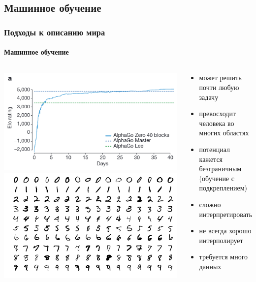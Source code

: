 \documentclass[10pt,pdf,hyperref={unicode}]{beamer}
\begin{document}
		
		\subsection{Машинное обучение}
		
			\begin{frame}
				\frametitle{Подходы к описанию мира} 
				\framesubtitle{Машинное обучение}
					\begin{columns}
							\includegraphics[width=\linewidth]{alphago.png}
							\includegraphics[width=\linewidth]{mnist.png}
						\begin{center}
							\begin{itemize}
								\item может решить почти любую задачу
								\item превосходит человека во многих областях
								\item потенциал кажется безграничным (обучение с подкреплением)
								\item сложно интерпретировать
								\item не всегда хорошо интерполирует  
								\item требуется много данных
							\end{itemize}
						\end{center}
					\end{columns}
			\end{frame}
			
\end{document}
